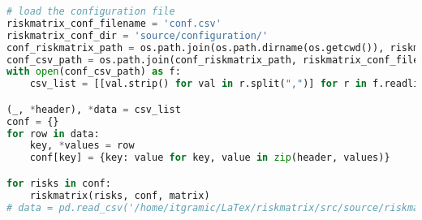 \begin{lstlisting}[language=python, caption=Python LaTex - riskmatrix.py - Risxikomatrizen,captionpos=b,label={lst:riskmatrix},breaklines=true]
# load the configuration file
riskmatrix_conf_filename = 'conf.csv'
riskmatrix_conf_dir = 'source/configuration/'
conf_riskmatrix_path = os.path.join(os.path.dirname(os.getcwd()), riskmatrix_conf_dir)
conf_csv_path = os.path.join(conf_riskmatrix_path, riskmatrix_conf_filename)
with open(conf_csv_path) as f:
    csv_list = [[val.strip() for val in r.split(",")] for r in f.readlines()]

(_, *header), *data = csv_list
conf = {}
for row in data:
    key, *values = row
    conf[key] = {key: value for key, value in zip(header, values)}

for risks in conf:
    riskmatrix(risks, conf, matrix)
# data = pd.read_csv('/home/itgramic/LaTex/riskmatrix/src/source/riskmatrixproblem.csv', header=None, dtype={0: str}).set_index(0).squeeze().to_dict()
\end{lstlisting}